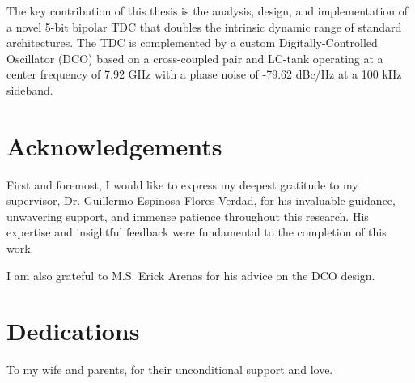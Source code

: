 \documentclass[twoside, 12pt]{report}   %
\theoremstyle{mytheoremstyle}
\theoremstyle{mytheoremstyle}
\theoremstyle{myproblemstyle}
\begin{document}
    The key contribution of this thesis is the analysis, design, and implementation of a novel 5-bit bipolar TDC that doubles the intrinsic dynamic range of standard architectures.
    The TDC is complemented by a custom Digitally-Controlled Oscillator (DCO) based on a cross-coupled pair and LC-tank operating at a center frequency of 7.92 GHz with a phase noise of
    -79.62 dBc/Hz at a 100 kHz sideband.

    \chapter*{Acknowledgements}
    First and foremost, I would like to express my deepest gratitude to my supervisor, Dr. Guillermo Espinosa Flores-Verdad, for his invaluable guidance, unwavering support,
    and immense patience throughout this research. His expertise and insightful feedback were fundamental to the completion of this work.

    I am also grateful to M.S. Erick Arenas for his advice on the DCO design.
    \chapter*{Dedications}
    To my wife and parents, for their unconditional support and love.
    \chapter*{}
    \tableofcontents
    \listoffigures
    \listoftables

    
    
    
    
    
    
    

    \printbibliography  %
\end{document}
